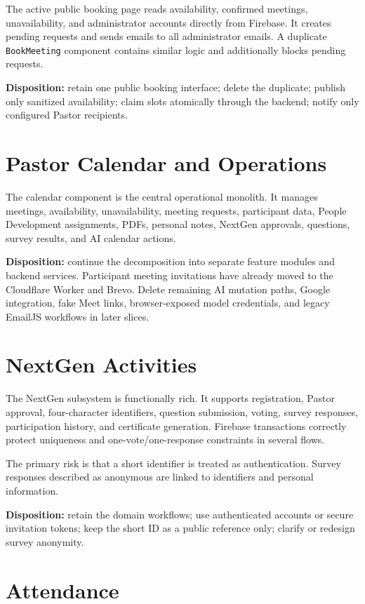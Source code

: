 \documentclass[11pt,a4paper,oneside]{report}
\begin{document}
The active public booking page reads availability, confirmed meetings, unavailability, and administrator accounts directly from Firebase. It creates pending requests and sends emails to all administrator emails. A duplicate \texttt{BookMeeting} component contains similar logic and additionally blocks pending requests.

\textbf{Disposition:} retain one public booking interface; delete the duplicate; publish only sanitized availability; claim slots atomically through the backend; notify only configured Pastor recipients.

\section{Pastor Calendar and Operations}

The calendar component is the central operational monolith. It manages meetings, availability, unavailability, meeting requests, participant data, People Development assignments, PDFs, personal notes, NextGen approvals, questions, survey results, and AI calendar actions.

\textbf{Disposition:} continue the decomposition into separate feature modules and backend services. Participant meeting invitations have already moved to the Cloudflare Worker and Brevo. Delete remaining AI mutation paths, Google integration, fake Meet links, browser-exposed model credentials, and legacy EmailJS workflows in later slices.

\section{NextGen Activities}

The NextGen subsystem is functionally rich. It supports registration, Pastor approval, four-character identifiers, question submission, voting, survey responses, participation history, and certificate generation. Firebase transactions correctly protect uniqueness and one-vote/one-response constraints in several flows.

The primary risk is that a short identifier is treated as authentication. Survey responses described as anonymous are linked to identifiers and personal information.

\textbf{Disposition:} retain the domain workflows; use authenticated accounts or secure invitation tokens; keep the short ID as a public reference only; clarify or redesign survey anonymity.

\section{Attendance}
\end{document}
